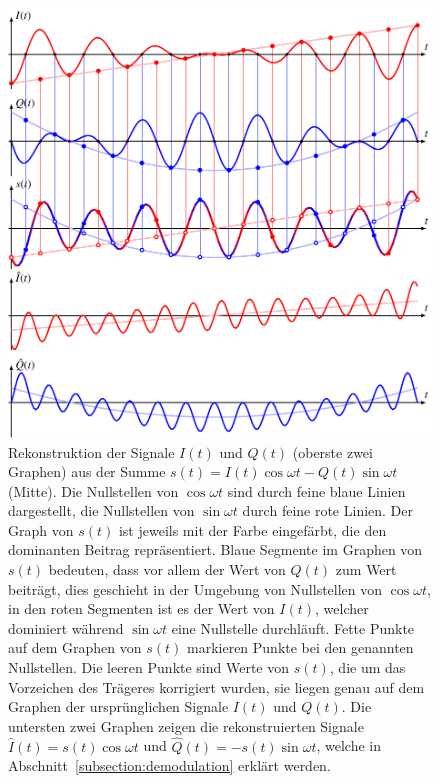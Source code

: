 \begin{figure}
\centering
\includegraphics{applications/qam/images/sep.pdf}
\caption{Rekonstruktion der Signale $I(t)$ und $Q(t)$ (oberste zwei Graphen)
aus der Summe $s(t) = I(t)\cos\omega t - Q(t)\sin\omega t$ (Mitte).
Die Nullstellen von $\cos\omega t$ sind durch feine blaue Linien 
dargestellt, die Nullstellen von $\sin\omega t$ durch feine rote Linien.
Der Graph von $s(t)$ ist jeweils mit der Farbe eingefärbt, die den
dominanten Beitrag repräsentiert.
Blaue Segmente im Graphen von $s(t)$ bedeuten, dass vor allem der Wert
von $Q(t)$ zum Wert beiträgt, dies geschieht in der Umgebung von
Nullstellen von $\cos\omega t$, in den roten Segmenten ist es der Wert von
$I(t)$, welcher dominiert während $\sin\omega t$ eine Nullstelle durchläuft.
Fette Punkte auf dem Graphen von $s(t)$ markieren Punkte bei den
genannten Nullstellen.
Die leeren Punkte sind Werte von $s(t)$, die um das Vorzeichen des
Trägeres korrigiert wurden, sie liegen genau auf dem Graphen der
ursprünglichen Signale $I(t)$ und $Q(t)$.
Die untersten zwei Graphen zeigen die rekonstruierten Signale
$\hat{I}(t)=s(t) \cos\omega t$ und $\hat{Q}(t) = -s(t) \sin\omega t$, 
welche in Abschnitt~\ref{subsection:demodulation} erklärt werden.
\label{figure:qam:sep}}
\end{figure}

